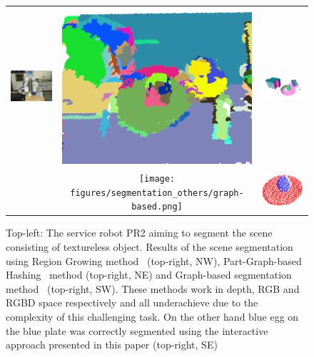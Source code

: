 \setlength{\tabcolsep}{0.1em}
\begin{figure}[ht]
\begin{tabular}{cccc}
\multicolumn{2}{c}{\multirow{-6}{*}{\includegraphics[width=0.5\columnwidth]{figures/teaser/IMG_0395.JPG}
}} & \includegraphics[width=0.23\columnwidth]{figures/segmentation_others/region_growing_rgb.png} 
&\includegraphics[width=0.23\columnwidth]{figures/segmentation_others/part-graph-hashing.png} \\
\multicolumn{2}{c}{} & \texttt{[image: figures/segmentation\_others/graph-based.png]} &\includegraphics[width=0.23\columnwidth]{pictures/teaser_egg_result-cropped.png} 
\end{tabular}
\caption{Top-left: The service robot PR2 aiming to segment the scene
  consisting of textureless object. Results  of  the   scene segmentation
  using Region  Growing  method~\cite{RGBRegionGrowing} (top-right, NW), Part-Graph-based 
  Hashing~\cite{marton12SC} method (top-right, NE) and Graph-based  
  segmentation method~\cite{Felzenszwalb}   (top-right, SW). These methods work in depth, RGB and RGBD 
  space respectively and all underachieve due to the complexity of this challenging task. 
  On the other hand blue egg on the blue plate was correctly segmented using the interactive approach presented in this paper (top-right, SE)}
\label{fig:tracking_dists}
\end{figure}	
	
